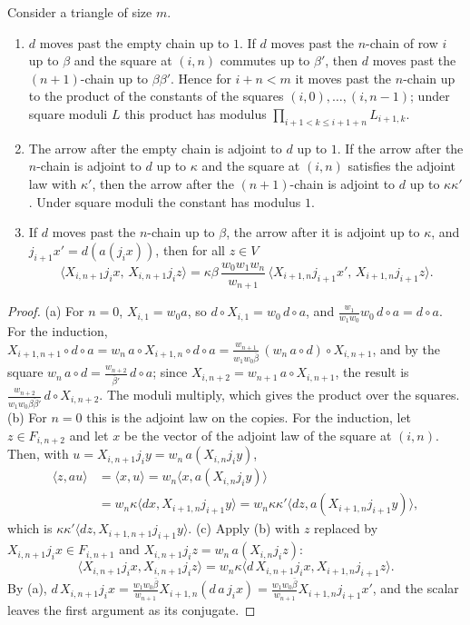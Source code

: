 \begin{lemma}\label{lem:chain-laws}
Consider a triangle of size $m$.
\begin{enumerate}[label=\textup{(\alph*)}]
\item $d$ moves past the empty chain up to $1$. If $d$ moves past the $n$-chain of row $i$ up to $\beta$ and the square at $(i,n)$ commutes up to $\beta'$, then $d$ moves past the $(n+1)$-chain up to $\beta\beta'$. Hence for
$i+n<m$ it moves past the $n$-chain up to the product of the constants of the squares $(i,0),\dots,(i,n-1)$; under square moduli $L$ this product has modulus $\prod_{i+1<k\le i+1+n}L_{i+1,k}$.
\item The arrow after the empty chain is adjoint to $d$ up to $1$. If the arrow after the $n$-chain is adjoint to $d$ up to $\kappa$ and the square at $(i,n)$ satisfies the adjoint law with $\kappa'$, then the
arrow after the $(n+1)$-chain is adjoint to $d$ up to $\kappa\kappa'$. Under square moduli the constant has modulus $1$.
\item If $d$ moves past the $n$-chain up to $\beta$, the arrow after it is adjoint up to $\kappa$, and $j_{i+1}x'=d(a(j_ix))$, then for all $z\in V$
\[
  \langle X_{i,n+1}j_ix,\,X_{i,n+1}j_iz\rangle=\kappa\beta\,\frac{w_0w_1w_n}{w_{n+1}}\,\langle X_{i+1,n}j_{i+1}x',\,X_{i+1,n}j_{i+1}z\rangle.
\]
\end{enumerate}
\end{lemma}

\begin{proof}
(a) For $n=0$, $X_{i,1}=w_0a$, so $d\circ X_{i,1}=w_0\,d\circ a$, and $\frac{w_1}{w_1w_0}w_0\,d\circ a=d\circ a$. For the induction, $X_{i+1,n+1}\circ d\circ a=w_n\,a\circ X_{i+1,n}\circ d\circ a=\frac{w_{n+1}}{w_1w_0\bar\beta}\,(w_n\,a\circ d)\circ X_{i,n+1}$,
and by the square $w_n\,a\circ d=\frac{w_{n+2}}{\bar\beta'}\,d\circ a$; since $X_{i,n+2}=w_{n+1}\,a\circ X_{i,n+1}$, the result is $\frac{w_{n+2}}{w_1w_0\overline{\beta\beta'}}\,d\circ X_{i,n+2}$. The moduli multiply, which gives the
product over the squares. (b) For $n=0$ this is the adjoint law on the copies. For the induction, let $z\in F_{i,n+2}$ and let $x$ be the vector of the adjoint law of the square at $(i,n)$. Then, with
$u=X_{i,n+1}j_iy=w_n\,a(X_{i,n}j_iy)$,
\begin{align*}
  \langle z,au\rangle&=\langle x,u\rangle=w_n\langle x,a(X_{i,n}j_iy)\rangle\\
  &=w_n\kappa\langle dx,X_{i+1,n}j_{i+1}y\rangle=w_n\kappa\kappa'\langle dz,a(X_{i+1,n}j_{i+1}y)\rangle,
\end{align*}
which is $\kappa\kappa'\langle dz,X_{i+1,n+1}j_{i+1}y\rangle$. (c) Apply (b) with $z$ replaced by $X_{i,n+1}j_ix\in F_{i,n+1}$ and $X_{i,n+1}j_iz=w_n\,a(X_{i,n}j_iz)$:
\[
  \langle X_{i,n+1}j_ix,X_{i,n+1}j_iz\rangle=w_n\kappa\langle d\,X_{i,n+1}j_ix,X_{i+1,n}j_{i+1}z\rangle.
\]
By (a), $d\,X_{i,n+1}j_ix=\frac{w_1w_0\bar\beta}{w_{n+1}}X_{i+1,n}(d\,a\,j_ix)=\frac{w_1w_0\bar\beta}{w_{n+1}}X_{i+1,n}j_{i+1}x'$, and the scalar leaves the first argument as its conjugate.
\end{proof}

